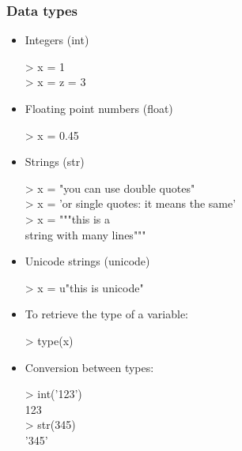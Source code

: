 \documentclass{beamer}
\let\textquotedbl="
\newenvironment{code}{%
  \begin{exampleblock}{}
      \ttfamily
    }{%
  \end{exampleblock}
}
\newcommand{\triple}{\textquotedbl\textquotedbl\textquotedbl}
\begin{document}
\begin{frame}[allowframebreaks]
    \frametitle{Data types}
    \begin{itemize}
    \item Integers (int)
        \begin{code}
            > x = 1\\
            > x = z = 3
        \end{code}
    \item Floating point numbers (float)
        \begin{code}
            > x = 0.45
        \end{code}
    \item Strings (str)
        \begin{code}
            > x = "you can use double quotes"\\
            > x = 'or single quotes: it means the same'\\
            > x = \triple this is a\\
              string with many lines\triple
        \end{code}
    \item Unicode strings (unicode)
        \begin{code}
            > x = u"this is unicode"
        \end{code}
    \item To retrieve the type of a variable:
        \begin{code}
            > type(x)
        \end{code}
    \item Conversion between types:
        \begin{code}
            > int('123') \\
            123\\
            > str(345)\\
            '345'
        \end{code}
    \end{itemize}
\end{frame}
\end{document}
